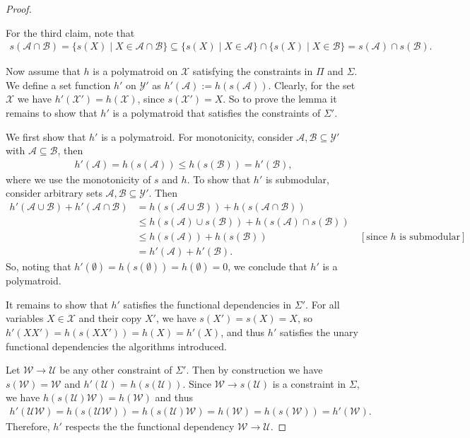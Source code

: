 \documentclass[a4paper,cleveref]{lipics-v2021}
\newcommand{\vset}[1]{\mathcal{#1}}
\begin{document}
\begin{proof}
\begin{claimproof}
		For the third claim, note that
		\begin{align*}
			s(\vset A\cap \vset B) = \{s(X)\mid X\in \vset A\cap \vset B\} \subseteq \{s(X)\mid X\in \vset A\} \cap \{s(X)\mid X\in \vset B\} = s(\vset A) \cap s(\vset B).
		\end{align*}
	\end{claimproof}
	Now assume that $h$ is a polymatroid on $\vset X$ satisfying the constraints in $\Pi$ and $\Sigma$. We define a set function $h'$ on $\vset Y'$ as
	 \(
	h'(\vset A):= h(s(\vset A)).
	\)
	Clearly, for the set $\vset X$ we have $h'(\vset X') = h(\vset X)$, since $s(\vset X') = X$. 
	So to prove the lemma it remains to show that $h'$ is a polymatroid that satisfies the constraints of $\Sigma'$. 
	
	We first show that $h'$ is a polymatroid. For monotonicity, consider $\vset A, \vset B\subseteq \vset Y'$ with $\vset A\subseteq \vset B$, then
	\begin{align*}
		h'(\vset A) = h(s(\vset A)) \le h(s(\vset B)) = h'(\vset B), 
	\end{align*}
	where we use the monotonicity of $s$ and $h$. To show that $h'$ is submodular, consider arbitrary sets $\vset A, \vset B\subseteq \vset Y'$. Then
	\begin{align*}
		h'(\vset A\cup \vset B) + h'(\vset A\cap \vset B) &= h(s(\vset A\cup \vset B)) + h(s(\vset A\cap \vset B))\\
		&\le h(s(\vset A)\cup s(\vset B)) + h(s(\vset A)\cap s(\vset B))\\
		& \le h(s(\vset A)) + h(s(\vset B)) &\ {[\text{since $h$ is submodular}]}\\
		& = h'(\vset A) + h'(\vset B).
	\end{align*}
	So, noting that $h'(\emptyset) = h(s(\emptyset)) = h(\emptyset) = 0$, we conclude that $h'$ is a polymatroid.
	
	It remains to show that $h'$ satisfies the functional dependencies in $\Sigma'$. For all variables $X\in \vset  X$ and their copy $X'$, we have $s(X') = s(X) = X$, so $h'(XX') = h(s(XX'))= h(X) = h'(X)$, and thus $h'$ satisfies the unary functional dependencies the algorithms introduced.
	
	Let $\vset W \rightarrow \vset U$ be any other constraint of $\Sigma'$. 
	Then by construction we have $s(\vset W) =\vset W$ and $h'(\vset U) = h(s(\vset U))$. Since $\vset W\rightarrow s(\vset U)$ is a constraint in $\Sigma$, we have $h(s(\vset U)\vset W)= h(\vset W)$ and thus
	\begin{align*}
		h'(\vset U \vset W) = h(s(\vset U \vset W)) = h(s(\vset U)\vset W) = h(\vset W) = h(s(\vset W)) = h'(\vset W).
	\end{align*}
	Therefore, $h'$ respects the the functional dependency $\vset W\rightarrow \vset U$.
\end{proof}
\end{document}
